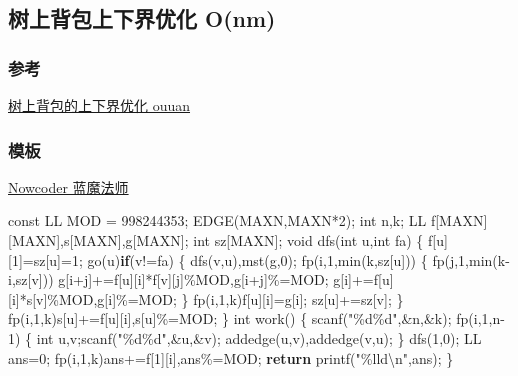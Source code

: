 \documentclass[
]{article}
\newenvironment{Shaded}{}{}
\newcommand{\AttributeTok}[1]{\textcolor[rgb]{0.49,0.56,0.16}{#1}}
\newcommand{\ControlFlowTok}[1]{\textcolor[rgb]{0.00,0.44,0.13}{\textbf{#1}}}
\newcommand{\DataTypeTok}[1]{\textcolor[rgb]{0.56,0.13,0.00}{#1}}
\newcommand{\DecValTok}[1]{\textcolor[rgb]{0.25,0.63,0.44}{#1}}
\newcommand{\NormalTok}[1]{#1}
\newcommand{\SpecialCharTok}[1]{\textcolor[rgb]{0.25,0.44,0.63}{#1}}
\newcommand{\StringTok}[1]{\textcolor[rgb]{0.25,0.44,0.63}{#1}}
\begin{document}
\hypertarget{ux6811ux4e0aux80ccux5305ux4e0aux4e0bux754cux4f18ux5316-onm}{%
\subsection{树上背包上下界优化
O(nm)}\label{ux6811ux4e0aux80ccux5305ux4e0aux4e0bux754cux4f18ux5316-onm}}

\hypertarget{ux53c2ux8003}{%
\subsubsection{参考}\label{ux53c2ux8003}}

\href{https://www.cnblogs.com/ouuan/p/BackpackOnTree.html}{树上背包的上下界优化
ouuan}

\hypertarget{ux6a21ux677f-12}{%
\subsubsection{模板}\label{ux6a21ux677f-12}}

\href{https://ac.nowcoder.com/acm/contest/6895/A}{Nowcoder 蓝魔法师}

\begin{Shaded}
\begin{Highlighting}[]
\AttributeTok{const}\NormalTok{ LL MOD = }\DecValTok{998244353}\NormalTok{;}
\NormalTok{EDGE(MAXN,MAXN*}\DecValTok{2}\NormalTok{);}
\DataTypeTok{int}\NormalTok{ n,k;}
\NormalTok{LL  f[MAXN][MAXN],s[MAXN],g[MAXN];}
\DataTypeTok{int}\NormalTok{ sz[MAXN];}
\DataTypeTok{void}\NormalTok{ dfs(}\DataTypeTok{int}\NormalTok{ u,}\DataTypeTok{int}\NormalTok{ fa) }
\NormalTok{\{   }
\NormalTok{    f[u][}\DecValTok{1}\NormalTok{]=sz[u]=}\DecValTok{1}\NormalTok{;}
\NormalTok{    go(u)}\ControlFlowTok{if}\NormalTok{(v!=fa)}
\NormalTok{    \{}
\NormalTok{        dfs(v,u),mst(g,}\DecValTok{0}\NormalTok{);}
\NormalTok{        fp(i,}\DecValTok{1}\NormalTok{,min(k,sz[u]))}
\NormalTok{        \{}
\NormalTok{            fp(j,}\DecValTok{1}\NormalTok{,min(k{-}i,sz[v]))}
\NormalTok{                g[i+j]+=f[u][i]*f[v][j]\%MOD,g[i+j]\%=MOD;}
\NormalTok{            g[i]+=f[u][i]*s[v]\%MOD,g[i]\%=MOD;}
\NormalTok{        \}}
\NormalTok{        fp(i,}\DecValTok{1}\NormalTok{,k)f[u][i]=g[i];}
\NormalTok{        sz[u]+=sz[v];}
\NormalTok{    \}}
\NormalTok{    fp(i,}\DecValTok{1}\NormalTok{,k)s[u]+=f[u][i],s[u]\%=MOD;}
\NormalTok{\}}
\DataTypeTok{int}\NormalTok{ work()}
\NormalTok{\{}
\NormalTok{    scanf(}\StringTok{"}\SpecialCharTok{\%d\%d}\StringTok{"}\NormalTok{,\&n,\&k);}
\NormalTok{    fp(i,}\DecValTok{1}\NormalTok{,n{-}}\DecValTok{1}\NormalTok{)}
\NormalTok{    \{}
        \DataTypeTok{int}\NormalTok{ u,v;scanf(}\StringTok{"}\SpecialCharTok{\%d\%d}\StringTok{"}\NormalTok{,\&u,\&v);}
\NormalTok{        addedge(u,v),addedge(v,u);}
\NormalTok{    \}}
\NormalTok{    dfs(}\DecValTok{1}\NormalTok{,}\DecValTok{0}\NormalTok{);}
\NormalTok{    LL ans=}\DecValTok{0}\NormalTok{;}
\NormalTok{    fp(i,}\DecValTok{1}\NormalTok{,k)ans+=f[}\DecValTok{1}\NormalTok{][i],ans\%=MOD;}
    \ControlFlowTok{return}\NormalTok{ printf(}\StringTok{"}\SpecialCharTok{\%lld\textbackslash{}n}\StringTok{"}\NormalTok{,ans);}
\NormalTok{\}}
\end{Highlighting}
\end{Shaded}
\end{document}
